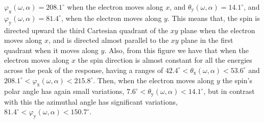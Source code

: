 \documentclass[prb,11pt,tightenlines,twocolumn,aps]{revtex4-1}
\begin{document}
$\varphi_{\mathrm{x}}(\omega,\alpha) = 208.1^{\circ}$ 
% 
when the  electron moves along $x$, and  
$\theta_{\mathrm{y}}(\omega,\alpha) = 14.1^{\circ}$, and
$\varphi_{\mathrm{y}} (\omega,\alpha) = 81.4^{\circ}$, 
% 
when the electron moves along $y$. This means that, the spin is directed upward
the third Cartesian quadrant of the $xy$ plane when the electron moves along
$x$, and is directed almost parallel to the $xy$ plane in the first quadrant
when it moves along $y$.
% 
Also, from this figure we have that when the electron moves along $x$ the spin
direction is almost constant for all the energies across the peak of the
response, having a ranges of
% 
$42.4^{\circ} < \theta_{\mathrm{x}}(\omega,\alpha) < 53.6^{\circ} $ 
and $208.1^{\circ} < \varphi_{\mathrm{x}} (\omega,\alpha) < 215.8^{\circ}$. 
% 
Then, when the electron moves along $y$ the spin's polar angle has again
small variations,
% 
$7.6^{\circ} < \theta_{\mathrm{y}} (\omega,\alpha) < 14.1^{\circ}$, 
% 
but in contrast with this the azimuthal angle has significant variations,
% 
$81.4^{\circ} < \varphi_{\mathrm{y}} (\omega,\alpha) < 150.7^{\circ}$.
\end{document}

